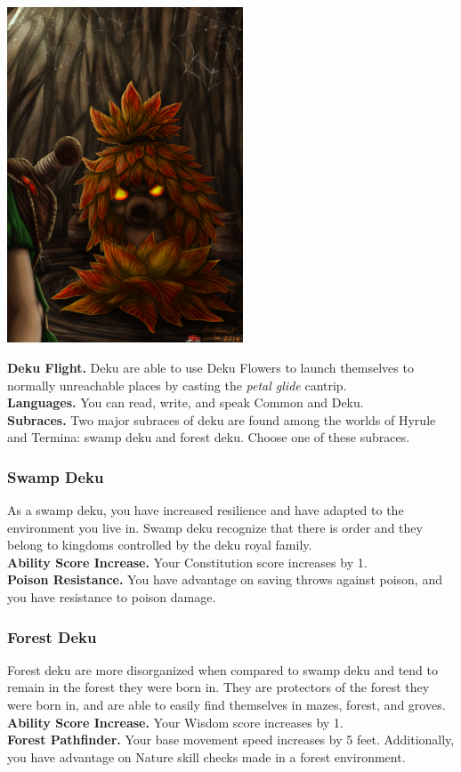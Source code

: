 \documentclass[10pt,twoside,twocolumn,openany]{book}
\begin{document}
\begin{center}
    \includegraphics[width=70mm,scale=0.5]{img/deku.jpg} 
\end{center}

\indent \textbf{Deku Flight.} Deku are able to use Deku Flowers to launch themselves to normally unreachable places by casting the \textit{petal glide} cantrip.\\
\indent \textbf{Languages.} You can read, write, and speak Common and Deku.\\
\indent \textbf{Subraces.} Two major subraces of deku are found among the worlds of Hyrule and Termina: swamp deku and forest deku. Choose one of these subraces.

\subsubsection{Swamp Deku}
As a swamp deku, you have increased resilience and have adapted to the environment you live in. Swamp deku recognize that there is order and they belong to kingdoms controlled by the deku royal family.\\
\indent \textbf{Ability Score Increase.} Your Constitution score increases by 1.\\
\indent \textbf{Poison Resistance.} You have advantage on saving throws against poison, and you have resistance to poison damage.

\subsubsection{Forest Deku}
Forest deku are more disorganized when compared to swamp deku and tend to remain in the forest they were born in. They are protectors of the forest they were born in, and are able to easily find themselves in mazes, forest, and groves.\\
\indent \textbf{Ability Score Increase.} Your Wisdom score increases by 1.\\
\indent \textbf{Forest Pathfinder.} Your base movement speed increases by 5 feet. Additionally, you have advantage on Nature skill checks made in a forest environment.
\end{document}
